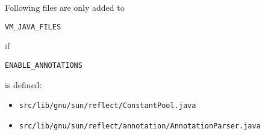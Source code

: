 \documentclass[a4paper, 10pt, titlepage]{scrartcl} %
\begin{document}
Following files are only added to \begin{scriptsize}\verb|VM_JAVA_FILES|\end{scriptsize} if
\begin{scriptsize}\verb|ENABLE_ANNOTATIONS|\end{scriptsize} is defined:
\begin{itemize}
 \item \begin{scriptsize}\verb|src|\hspace{0.0pt}\verb|/|\hspace{0.0pt}\verb|lib|\hspace{0.0pt}\verb|/|\hspace{0.0pt}\verb|gnu|\hspace{0.0pt}\verb|/|\hspace{0.0pt}\verb|sun|\hspace{0.0pt}\verb|/|\hspace{0.0pt}\verb|reflect|\hspace{0.0pt}\verb|/|\hspace{0.0pt}\verb|ConstantPool|\hspace{0.0pt}\verb|.|\hspace{0.0pt}\verb|java|\end{scriptsize}
 \item \begin{scriptsize}\verb|src|\hspace{0.0pt}\verb|/|\hspace{0.0pt}\verb|lib|\hspace{0.0pt}\verb|/|\hspace{0.0pt}\verb|gnu|\hspace{0.0pt}\verb|/|\hspace{0.0pt}\verb|sun|\hspace{0.0pt}\verb|/|\hspace{0.0pt}\verb|reflect|\hspace{0.0pt}\verb|/|\hspace{0.0pt}\verb|annotation|\hspace{0.0pt}\verb|/|\hspace{0.0pt}\verb|AnnotationParser|\hspace{0.0pt}\verb|.|\hspace{0.0pt}\verb|java|\end{scriptsize}

\end{itemize}
\end{document}
